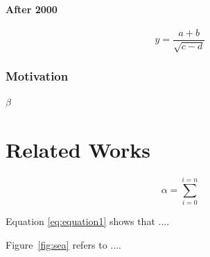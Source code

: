 \documentclass{book}
\begin{document}
\subsubsection{After 2000}
\begin{equation}
    y = \frac{a + b}{\sqrt{c-d}}
    \label{eq:equation1}
\end{equation}

\subsection{Motivation}
$\beta$
\newpage

\chapter{Related Works}
\begin{equation}
    \alpha = \sum_{i=0}^{i=n}
    \label{eq:eqation2}
\end{equation}

Equation \ref{eq:equation1} shows that ....

Figure~\ref{fig:sea} refers to ....
\end{document}
